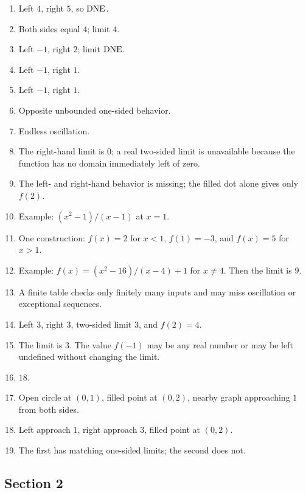 \begin{enumerate}[label=\textbf{1.\arabic*}]
  \item Left \(4\), right \(5\), so \(\mathrm{DNE}\).
  \item Both sides equal \(4\); limit \(4\).
  \item Left \(-1\), right \(2\); limit \(\mathrm{DNE}\).
  \item Left \(-1\), right \(1\).
  \item Left \(-1\), right \(1\).
  \item Opposite unbounded one-sided behavior.
  \item Endless oscillation.
  \item The right-hand limit is \(0\); a real two-sided limit is unavailable because the function has no domain immediately left of zero.
  \item The left- and right-hand behavior is missing; the filled dot alone gives only \(f(2)\).
  \item Example: \((x^2-1)/(x-1)\) at \(x=1\).
  \item One construction: \(f(x)=2\) for \(x<1\), \(f(1)=-3\), and \(f(x)=5\) for \(x>1\).
  \item Example: \(f(x)=(x^2-16)/(x-4)+1\) for \(x\ne4\). Then the limit is \(9\).
  \item A finite table checks only finitely many inputs and may miss oscillation or exceptional sequences.
  \item Left \(3\), right \(3\), two-sided limit \(3\), and \(f(2)=4\).
  \item The limit is \(3\). The value \(f(-1)\) may be any real number or may be left undefined without changing the limit.
  \item \(18\).
  \item Open circle at \((0,1)\), filled point at \((0,2)\), nearby graph approaching \(1\) from both sides.
  \item Left approach \(1\), right approach \(3\), filled point at \((0,2)\).
  \item The first has matching one-sided limits; the second does not.
\end{enumerate}

\subsection*{Section 2}

